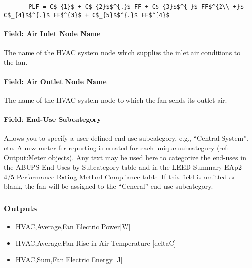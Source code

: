 \begin{lstlisting}
       PLF = C$_{1}$ + C$_{2}$$^{.}$ FF + C$_{3}$$^{.}$ FF$^{2\\ +}$ C$_{4}$$^{.}$ FF$^{3}$ + C$_{5}$$^{.}$ FF$^{4}$
\end{lstlisting}

\paragraph{Field: Air Inlet Node Name}\label{field-air-inlet-node-name-2-000}

The name of the HVAC system node which supplies the inlet air conditions to the fan.

\paragraph{Field: Air Outlet Node Name}\label{field-air-outlet-node-name-2-000}

The name of the HVAC system node to which the fan sends its outlet air.

\paragraph{Field: End-Use Subcategory}\label{field-end-use-subcategory-2-000}

Allows you to specify a user-defined end-use subcategory, e.g., ``Central System'', etc. A new meter for reporting is created for each unique subcategory (ref: \hyperref[outputmeter-and-outputmetermeterfileonly]{Output:Meter} objects). Any text may be used here to categorize the end-uses in the ABUPS End Uses by Subcategory table and in the LEED Summary EAp2-4/5 Performance Rating Method Compliance table. If this field is omitted or blank, the fan will be assigned to the ``General'' end-use subcategory.

\subsubsection{Outputs}\label{outputs-2-009}

\begin{itemize}
\item
  HVAC,Average,Fan Electric Power{[}W{]}
\item
  HVAC,Average,Fan Rise in Air Temperature {[}deltaC{]}
\item
  HVAC,Sum,Fan Electric Energy {[}J{]}
\end{itemize}

